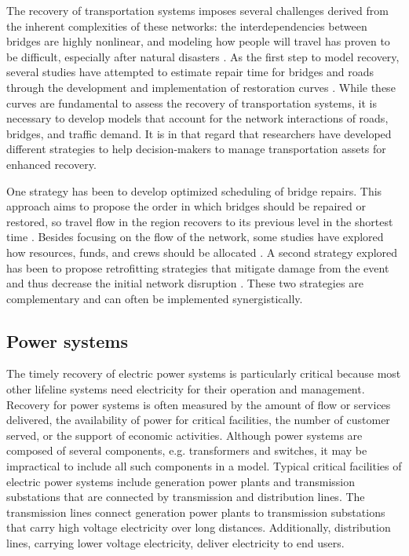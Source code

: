 The recovery of transportation systems imposes several challenges derived from the inherent complexities of these networks: the interdependencies between bridges are highly nonlinear, and modeling how people will travel has proven to be difficult, especially after natural disasters \citep{chang2010transportation}. As the first step to model recovery, several studies have attempted to estimate repair time for bridges and roads through the development and implementation of restoration curves \citep{HAZUS-MH2015,padgett2007bridge}. While these curves are fundamental to assess the recovery of transportation systems, it is necessary to develop models that account for the network interactions of roads, bridges, and traffic demand. It is in that regard that researchers have developed different strategies to help decision-makers to manage transportation assets for enhanced recovery.

One strategy has been to develop optimized scheduling of bridge repairs. This approach aims to propose the order in which bridges should be repaired or restored, so travel flow in the region recovers to its previous level in the shortest time \citep{vugrin2014optimal}. Besides focusing on the flow of the network, some studies have explored how resources, funds, and crews should be allocated \citep{karlaftis2007fund}. A second strategy explored has been to propose retrofitting strategies that mitigate damage from the event and thus decrease the initial network disruption \citep{zhang2016resilience}. These two strategies are complementary and can often be implemented synergistically.\ 

\subsection{Power systems}
The timely recovery of electric power systems is particularly critical because most other lifeline systems need electricity for their operation and management. Recovery for power systems is often measured by the amount of flow or services delivered, the availability of power for critical facilities, the number of customer served, or the support of economic activities. Although power systems are composed of several components, e.g. transformers and switches, it may be impractical to include all such components in a model. Typical critical facilities of electric power systems include generation power plants and transmission substations that are connected by transmission and distribution lines. The transmission lines connect generation power plants to transmission substations that carry high voltage electricity over long distances. Additionally, distribution lines, carrying lower voltage electricity, deliver electricity to end users. \

